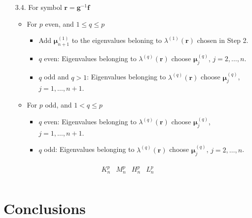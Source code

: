 \documentclass[10pt]{article}
\begin{document}
\begin{enumerate}
\item[3.4.] For symbol $\mathbf{r}=\mathbf{g}^{-1}\mathbf{f}$
\begin{itemize}
\item For $p$ even, and $1\leq q\leq p$
\begin{itemize}
\item Add $\boldsymbol{\mu}_{n+1}^{(1)}$ to the eigenvalues beloning to $\lambda^{(1)}(\mathbf{r})$ chosen in Step 2.
\item $q$ even: Eigenvalues belonging to $\lambda^{(q)}(\mathbf{r})$ choose $\boldsymbol{\mu}_j^{(q)}$, $j=2,\ldots, n$.
\item $q$ odd and $q>1$: Eigenvalues belonging to $\lambda^{(q)}(\mathbf{r})$ choose $\boldsymbol{\mu}_j^{(q)}$, $j=1,\ldots, n+1$.
\end{itemize}
\item For $p$ odd, and $1<q\leq p$
\begin{itemize}
\item $q$ even: Eigenvalues belonging to $\lambda^{(q)}(\mathbf{r})$ choose $\boldsymbol{\mu}_j^{(q)}$, $j=1,\ldots, n+1$.
\item $q$ odd: Eigenvalues belonging to $\lambda^{(q)}(\mathbf{r})$ choose $\boldsymbol{\mu}_j^{(q)}$, $j=2,\ldots, n$.
\end{itemize}
\end{itemize}
\end{enumerate}
\begin{align}
\begin{array}{rrrrrrrrrrrr}
K_n^{p}&M_n^{p}&H_n^{p}&L_n^{p}\\
\end{array}\nonumber
\end{align}
\section{Conclusions}
{}

\end{document}
